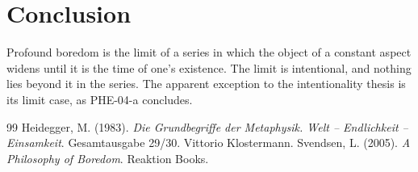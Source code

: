 \documentclass{situationist-preprint}
\begin{document}
\section{Conclusion}

Profound boredom is the limit of a series in which the object of a constant aspect widens until it is the time of one's existence. The limit is intentional, and nothing lies beyond it in the series. The apparent exception to the intentionality thesis is its limit case, as PHE-04-a concludes.

\begin{thebibliography}{99}\small
{} Heidegger, M. (1983). \emph{Die Grundbegriffe der Metaphysik. Welt -- Endlichkeit -- Einsamkeit}. Gesamtausgabe 29/30. Vittorio Klostermann.
 Svendsen, L. (2005). \emph{A Philosophy of Boredom}. Reaktion Books.
\end{thebibliography}
\end{document}
